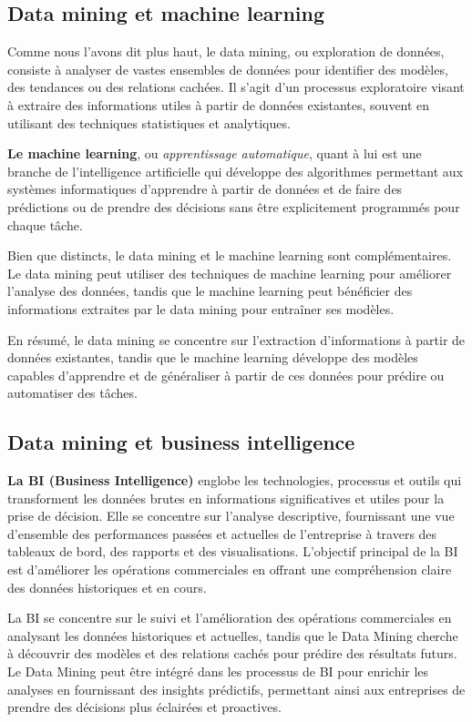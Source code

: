 \documentclass[a4paper,12pt]{article}
\begin{document}
        
    \subsection{Data mining et machine learning} 
        Comme nous l'avons dit plus haut, le data mining, ou exploration de données, consiste à analyser de vastes ensembles de données pour identifier des modèles, des tendances ou des relations cachées. Il s'agit d'un processus exploratoire visant à extraire des informations utiles à partir de données existantes, souvent en utilisant des techniques statistiques et analytiques.
        
        \textbf{Le machine learning}, ou \textit{apprentissage automatique}, quant à lui est une branche de l'intelligence artificielle qui développe des algorithmes permettant aux systèmes informatiques d'apprendre à partir de données et de faire des prédictions ou de prendre des décisions sans être explicitement programmés pour chaque tâche.
        
        Bien que distincts, le data mining et le machine learning sont complémentaires. Le data mining peut utiliser des techniques de machine learning pour améliorer l'analyse des données, tandis que le machine learning peut bénéficier des informations extraites par le data mining pour entraîner ses modèles. 
        
        En résumé, le data mining se concentre sur l'extraction d'informations à partir de données existantes, tandis que le machine learning développe des modèles capables d'apprendre et de généraliser à partir de ces données pour prédire ou automatiser des tâches.
        
        
    \subsection{Data mining et business intelligence} 
        \textbf{La BI (Business Intelligence)} englobe les technologies, processus et outils qui transforment les données brutes en informations significatives et utiles pour la prise de décision. Elle se concentre sur l'analyse descriptive, fournissant une vue d'ensemble des performances passées et actuelles de l'entreprise à travers des tableaux de bord, des rapports et des visualisations. L'objectif principal de la BI est d'améliorer les opérations commerciales en offrant une compréhension claire des données historiques et en cours.
        
        La BI se concentre sur le suivi et l'amélioration des opérations commerciales en analysant les données historiques et actuelles, tandis que le Data Mining cherche à découvrir des modèles et des relations cachés pour prédire des résultats futurs. Le Data Mining peut être intégré dans les processus de BI pour enrichir les analyses en fournissant des insights prédictifs, permettant ainsi aux entreprises de prendre des décisions plus éclairées et proactives.
\newpage
\end{document}
